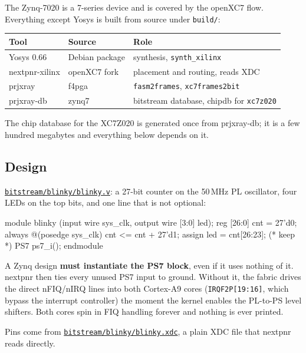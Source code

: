\documentclass[11pt,a4paper,oneside]{article}
\newcommand{\file}[1]{{\color{bluemid}\nolinkurl{#1}}}
\newcommand{\cmd}[1]{\texttt{#1}}
\newcommand{\repo}{https://github.com/MaxClerkwell/ax7020-bringup}
\newcommand{\rfile}[1]{\href{\repo/blob/master/#1}{\color{bluemid}\nolinkurl{#1}}}
\begin{document}
The Zynq-7020 is a 7-series device and is covered by the openXC7 flow.
Everything except Yosys is built from source under \file{build/}:

\begin{center}\small
\begin{tabular}{@{}lll@{}}
\toprule
Tool & Source & Role \\
\midrule
Yosys 0.66 & Debian package & synthesis, \cmd{synth\_xilinx} \\
nextpnr-xilinx & openXC7 fork & placement and routing, reads XDC \\
prjxray & f4pga & \cmd{fasm2frames}, \cmd{xc7frames2bit} \\
prjxray-db & zynq7 & bitstream database, chipdb for \cmd{xc7z020} \\
\bottomrule
\end{tabular}
\end{center}

The chip database for the XC7Z020 is generated once from prjxray-db; it is
a few hundred megabytes and everything below depends on it.

\subsection{Design}

\rfile{bitstream/blinky/blinky.v}: a 27-bit counter on the 50\,MHz PL
oscillator, four LEDs on the top bits, and one line that is not optional:

\begin{code}
module blinky (input wire sys_clk, output wire [3:0] led);
    reg [26:0] cnt = 27'd0;
    always @(posedge sys_clk) cnt <= cnt + 27'd1;
    assign led = cnt[26:23];
    (* keep *) PS7 ps7_i();
endmodule
\end{code}

\begin{mustknow}
A Zynq design \textbf{must instantiate the PS7 block}, even if it uses
nothing of it. nextpnr then ties every unused PS7 input to ground. Without
it, the fabric drives the direct nFIQ/nIRQ lines into both Cortex-A9 cores
(\cmd{IRQF2P[19:16]}, which bypass the interrupt controller) the moment the
kernel enables the PL-to-PS level shifters. Both cores spin in FIQ handling
forever and nothing is ever printed.
\end{mustknow}

Pins come from \rfile{bitstream/blinky/blinky.xdc}, a plain XDC file that
nextpnr reads directly.
\end{document}
